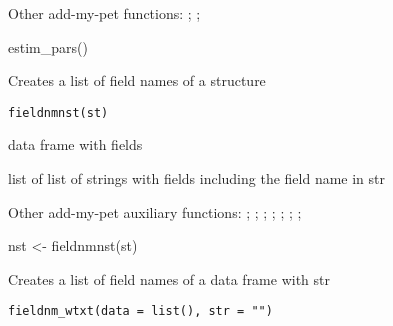 \documentclass[a4paper]{book}
\begin{document}
%
\begin{SeeAlso}\relax
Other add-my-pet functions: ;
; 
\end{SeeAlso}
%
\begin{Examples}
\begin{ExampleCode}
estim_pars()
\end{ExampleCode}
\end{Examples}
%
\begin{Description}\relax
Creates a list of field names of a structure
\end{Description}
%
\begin{Usage}
\begin{verbatim}
fieldnmnst(st)
\end{verbatim}
\end{Usage}
%
\begin{Arguments}
\begin{ldescription}
\item[\code{st}] data frame with fields
\end{ldescription}
\end{Arguments}
%
\begin{Value}
list of list of strings with fields including the field name in str
\end{Value}
%
\begin{SeeAlso}\relax
Other add-my-pet auxiliary functions: ;
; ;
; ;
;
; 
\end{SeeAlso}
%
\begin{Examples}
\begin{ExampleCode}
nst <- fieldnmnst(st)
\end{ExampleCode}
\end{Examples}
%
\begin{Description}\relax
Creates a list of field names of a data frame with str
\end{Description}
%
\begin{Usage}
\begin{verbatim}
fieldnm_wtxt(data = list(), str = "")
\end{verbatim}
\end{Usage}
\end{document}
